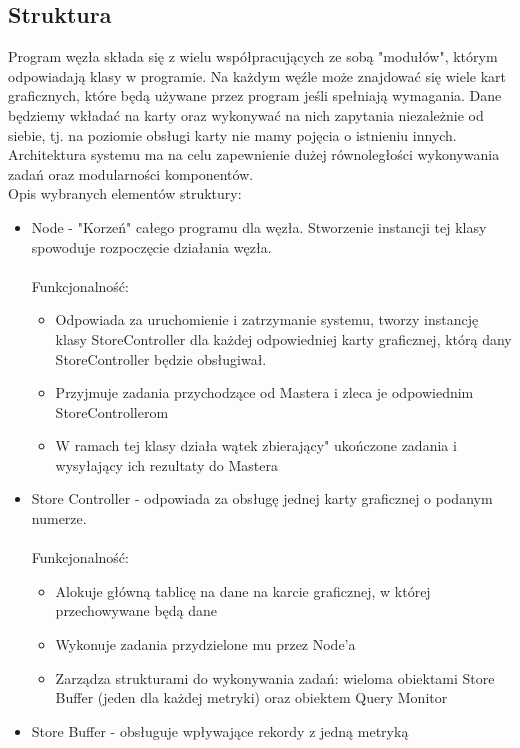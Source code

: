 \documentclass[paper=a4, fontsize=11pt]{scrartcl} %
\numberwithin{equation}{section} %
\numberwithin{figure}{section} %
\numberwithin{table}{section} %
\begin{document}
	\subsection{Struktura}
		Program węzła składa się z wielu współpracujących ze sobą "modułów", którym odpowiadają klasy w programie. Na każdym węźle może znajdować się
		wiele kart graficznych, które będą używane przez program jeśli spełniają wymagania. Dane będziemy wkładać na karty oraz wykonywać na nich zapytania
		niezależnie od siebie, tj. na poziomie obsługi karty nie mamy pojęcia o istnieniu innych. Architektura systemu ma na celu zapewnienie dużej 
		równoległości wykonywania zadań oraz modularności komponentów. \\
		Opis wybranych elementów struktury:
		\begin{itemize}
			\item Node - "Korzeń" całego programu dla węzła. Stworzenie instancji tej klasy spowoduje rozpoczęcie działania węzła. \\ \\
				Funkcjonalność: 
				\begin{itemize}
					\item Odpowiada za uruchomienie i zatrzymanie systemu, tworzy instancję klasy StoreController dla każdej odpowiedniej karty
						graficznej, którą dany StoreController będzie obsługiwał.
					\item Przyjmuje zadania przychodzące od Mastera i zleca je odpowiednim StoreControllerom
					\item W ramach tej klasy działa wątek 
zbierający" ukończone zadania i wysyłający ich rezultaty do Mastera
				\end{itemize}
			\item Store Controller - odpowiada za obsługę jednej karty graficznej o podanym numerze. \\ \\
				Funkcjonalność: 
				\begin{itemize}
					\item Alokuje główną tablicę na dane na karcie graficznej, w której przechowywane będą dane
					\item Wykonuje zadania przydzielone mu przez Node'a
					\item Zarządza strukturami do wykonywania zadań: wieloma obiektami Store Buffer (jeden dla każdej metryki) oraz obiektem Query Monitor
				\end{itemize}
			\item Store Buffer - obsługuje wpływające rekordy z jedną metryką \\ \\

\end{itemize}
\end{document}
